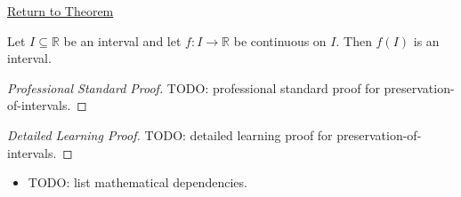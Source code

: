 \newpage
{}
\label{prf:preservation-of-intervals}

\begin{remark*}[Return]
\hyperref[thm:preservation-of-intervals]{Return to Theorem}
\end{remark*}

\begin{theorem*}
Let $I \subseteq \mathbb{R}$ be an interval and let $f : I \to \mathbb{R}$ be continuous on $I$. Then $f(I)$ is an interval.
\end{theorem*}

\begin{proof}[Professional Standard Proof]
\LRAProofBodyStart
TODO: professional standard proof for preservation-of-intervals.
\end{proof}

\begin{proof}[Detailed Learning Proof]
\LRAProofBodyStart
TODO: detailed learning proof for preservation-of-intervals.
\end{proof}

\begin{remark*}
\end{remark*}

\begin{dependencies}
\begin{itemize}
  \item TODO: list mathematical dependencies.
\end{itemize}
\end{dependencies}

\clearpage
